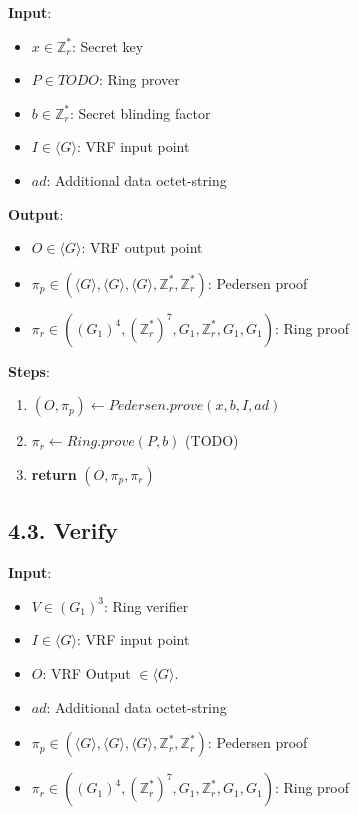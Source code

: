 \documentclass[
]{article}
\providecommand{\tightlist}{%
  \setlength{\itemsep}{0pt}\setlength{\parskip}{0pt}}
\begin{document}
\textbf{Input}:

\begin{itemize}
\tightlist
\item
  \(x \in \mathbb{Z}^*_r\): Secret key
\item
  \(P \in TODO\): Ring prover
\item
  \(b \in \mathbb{Z}^*_r\): Secret blinding factor
\item
  \(I \in \langle G \rangle\): VRF input point
\item
  \(ad\): Additional data octet-string
\end{itemize}

\textbf{Output}:

\begin{itemize}
\tightlist
\item
  \(O \in \langle G \rangle\): VRF output point
\item
  \(\pi_p \in (\langle G \rangle, \langle G \rangle, \langle G \rangle, \mathbb{Z}^*_r, \mathbb{Z}^*_r)\):
  Pedersen proof
\item
  \(\pi_r \in ((G_1)^4, (\mathbb{Z}^*_r)^7, G_1, \mathbb{Z}^*_r, G_1, G_1)\):
  Ring proof
\end{itemize}

\textbf{Steps}:

\begin{enumerate}
\def\labelenumi{\arabic{enumi}.}
\tightlist
\item
  \((O, \pi_p) \leftarrow Pedersen.prove(x, b, I, ad)\)
\item
  \(\pi_r \leftarrow Ring.prove(P, b)\) (TODO)
\item
  \textbf{return} \((O, \pi_p, \pi_r)\)
\end{enumerate}

\hypertarget{verify-2}{%
\subsection{4.3. Verify}\label{verify-2}}

\textbf{Input}:

\begin{itemize}
\tightlist
\item
  \(V \in (G_1)^3\): Ring verifier
\item
  \(I \in \langle G \rangle\): VRF input point
\item
  \(O\): VRF Output \(\in \langle G \rangle\).
\item
  \(ad\): Additional data octet-string
\item
  \(\pi_p \in (\langle G \rangle, \langle G \rangle, \langle G \rangle, \mathbb{Z}^*_r, \mathbb{Z}^*_r)\):
  Pedersen proof
\item
  \(\pi_r \in ((G_1)^4, (\mathbb{Z}^*_r)^7, G_1, \mathbb{Z}^*_r, G_1, G_1)\):
  Ring proof
\end{itemize}
\end{document}
